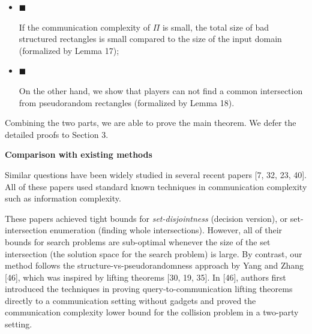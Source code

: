 \documentclass[10pt,a4paper]{article}
\begin{document}
\begin{itemize}


\item[] 
$\blacksquare$ 


If the communication complexity of $\Pi$ is small, the total size of bad structured rectangles is small compared to the size of the input domain (formalized by Lemma 17);\par





\item[] 
$\blacksquare$ 


On the other hand, we show that players can not find a common intersection from pseudorandom rectangles (formalized by Lemma 18).\par





\end{itemize}




Combining the two parts, we are able to prove the main theorem. We defer the detailed proofs to Section 3.\par




\par\medskip\noindent\textbf{Comparison with existing methods}\par




Similar questions have been widely studied in several recent papers [7, 32, 23, 40]. All of these papers used standard known techniques in communication complexity such as information complexity.\par




These papers achieved tight bounds for \emph{set-disjointness} (decision version), or set-intersection enumeration (finding whole intersections). However, all of their bounds for search problems are sub-optimal whenever the size of the set intersection (the solution space for the search problem) is large. By contrast, our method follows the structure-vs-pseudorandomness approach by Yang and Zhang [46], which was inspired by lifting theorems [30, 19, 35]. In [46], authors first introduced the techniques in proving query-to-communication lifting theorems directly to a communication setting without gadgets and proved the communication complexity lower bound for the collision problem in a two-party setting.\par
\end{document}

